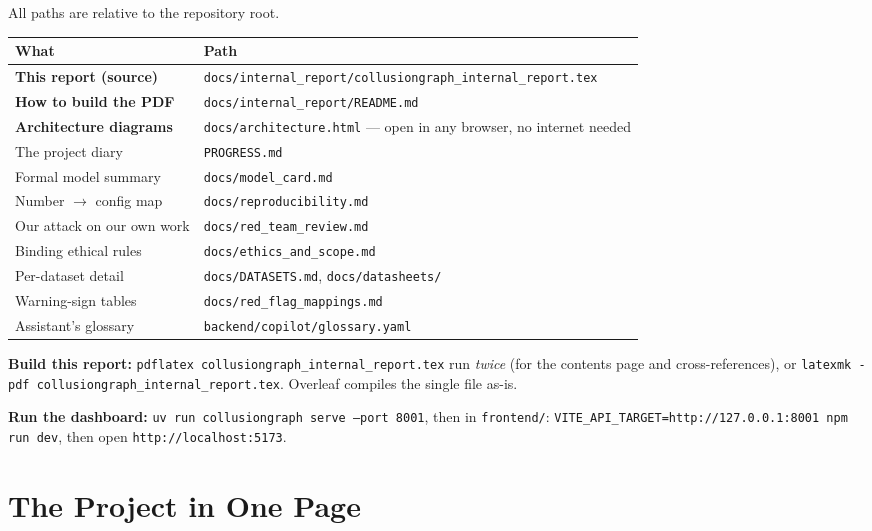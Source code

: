 \documentclass[11pt,a4paper]{article}
\newcommand{\code}[1]{\texttt{\small #1}}
\begin{document}
All paths are relative to the repository root.

\begin{center}\small
\begin{tabular}{@{}p{4.6cm}p{10.4cm}@{}}
\toprule
\textbf{What} & \textbf{Path} \\
\midrule
\textbf{This report (source)} & \code{docs/internal\_report/collusiongraph\_internal\_report.tex} \\
\textbf{How to build the PDF} & \code{docs/internal\_report/README.md} \\
\textbf{Architecture diagrams} & \code{docs/architecture.html} \quad --- open in any browser, no internet needed \\
\midrule
The project diary & \code{PROGRESS.md} \\
Formal model summary & \code{docs/model\_card.md} \\
Number $\rightarrow$ config map & \code{docs/reproducibility.md} \\
Our attack on our own work & \code{docs/red\_team\_review.md} \\
Binding ethical rules & \code{docs/ethics\_and\_scope.md} \\
Per-dataset detail & \code{docs/DATASETS.md}, \code{docs/datasheets/} \\
Warning-sign tables & \code{docs/red\_flag\_mappings.md} \\
Assistant's glossary & \code{backend/copilot/glossary.yaml} \\
\bottomrule
\end{tabular}
\end{center}

\begin{plain}
\textbf{Build this report:} \code{pdflatex collusiongraph\_internal\_report.tex}
run \emph{twice} (for the contents page and cross-references), or
\code{latexmk -pdf collusiongraph\_internal\_report.tex}. Overleaf compiles the
single file as-is.

\textbf{Run the dashboard:} \code{uv run collusiongraph serve --port 8001}, then
in \code{frontend/}: \code{VITE\_API\_TARGET=http://127.0.0.1:8001 npm run dev},
then open \code{http://localhost:5173}.
\end{plain}

\newpage

\section{The Project in One Page}
\label{sec:story}
\end{document}
